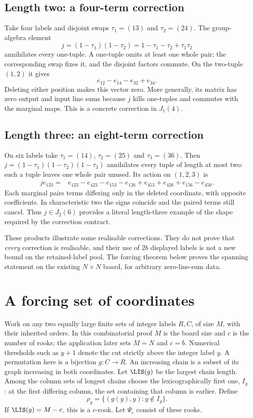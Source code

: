 \documentclass[11pt,a4paper,oneside,openany]{book}
\theoremstyle{definition}\newtheorem{definition}[theorem]{Definition}
\theoremstyle{remark}\newtheorem{remark}[theorem]{Remark}
\numberwithin{equation}{chapter}
\begin{document}
\subsection{Length two: a four-term correction}
Take four labels and disjoint swaps $\tau_1=(13)$ and $\tau_2=(24)$.
The group-algebra element
\[
                  j=(1-\tau_1)(1-\tau_2)
                    =1-\tau_1-\tau_2+\tau_1\tau_2
\]
annihilates every one-tuple. A one-tuple omits at least one whole
pair; the corresponding swap fixes it, and the disjoint factors
commute. On the two-tuple $(1,2)$ it gives
\[
                       e_{12}-e_{14}-e_{32}+e_{34}.
\]
Deleting either position makes this vector zero. More generally,
its matrix has zero output and input line sums because $j$ kills
one-tuples and commutes with the marginal maps. This is a concrete
correction in $J_1(4)$.

\subsection{Length three: an eight-term correction}
On six labels take $\tau_1=(14)$, $\tau_2=(25)$ and $\tau_3=(36)$.
Then $j=(1-\tau_1)(1-\tau_2)(1-\tau_3)$ annihilates every tuple
of length at most two: such a tuple leaves one whole pair unused.
Its action on $(1,2,3)$ is
\begin{align*}
 j e_{123}={}&e_{123}-e_{423}-e_{153}-e_{126}
                  +e_{453}+e_{426}+e_{156}-e_{456}.
\end{align*}
Each marginal pairs terms differing only in the deleted coordinate,
with opposite coefficients. In characteristic two the signs coincide
and the paired terms still cancel. Thus $j\in J_2(6)$ provides a
literal length-three example of the shape required by the correction
contract.

These products illustrate some realisable corrections. They do not
prove that \emph{every} correction is realisable, and their use of
$2b$ displayed labels is not a new bound on the retained-label pool.
The forcing theorem below proves the spanning statement on the
existing $N\times N$ board, for arbitrary zero-line-sum data.

\section{A forcing set of coordinates}\label{tx:sec:forcing}
Work on any two equally large finite sets of integer labels $R,C$,
of size $M$, with their inherited orders. In this combinatorial proof
$M$ is the board size and $c$ is the number of rooks; the application
later sets $M=N$ and $c=b$. Numerical thresholds such as
$y+1$ denote the cut strictly above the integer label $y$. A permutation here is a bijection $g:C\to R$. An increasing chain is a subset of its graph increasing in both coordinates. Let $\LIS(g)$ be the largest chain length. Among the column sets of longest chains choose the lexicographically first one, $I_g$: at the first differing column, the set containing that column is earlier. Define
\[\rho_g=\{(g(y),y):y\notin I_g\}.
\]
If $\LIS(g)=M-c$, this is a $c$-rook. Let $\Psi_c$ consist of these rooks.
\end{document}
